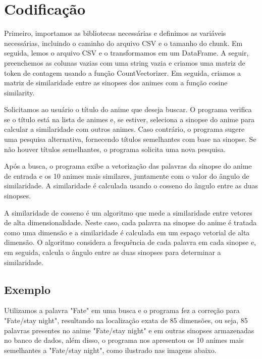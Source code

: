 \documentclass[12pt,a4]{article}
\begin{document}
\section{Codificação}
\begin{flushleft}
Primeiro, importamos as bibliotecas necessárias e definimos as variáveis necessárias, incluindo o caminho do arquivo CSV e o tamanho do chunk. Em seguida, lemos o arquivo CSV e o transformamos em um DataFrame. A seguir, preenchemos as colunas vazias com uma string vazia e criamos uma matriz de token de contagem usando a função CountVectorizer. Em seguida, criamos a matriz de similaridade entre as sinopses dos animes com a função cosine similarity.
\end{flushleft}
\begin{flushleft}
Solicitamos ao usuário o título do anime que deseja buscar. O programa verifica se o título está na lista de animes e, se estiver, seleciona a sinopse do anime para calcular a similaridade com outros animes. Caso contrário, o programa sugere uma pesquisa alternativa, fornecendo títulos semelhantes com base na sinopse. Se não houver títulos semelhantes, o programa solicita uma nova pesquisa.
\end{flushleft}
\begin{flushleft}
Após a busca, o programa exibe a vetorização das palavras da sinopse do anime de entrada e os 10 animes mais similares, juntamente com o valor do ângulo de similaridade. A similaridade é calculada usando o cosseno do ângulo entre as duas sinopses.
\end{flushleft}
\begin{flushleft}
A similaridade de cosseno é um algoritmo que mede a similaridade entre vetores de alta dimensionalidade. Neste caso, cada palavra na sinopse do anime é tratada como uma dimensão e a similaridade é calculada em um espaço vetorial de alta dimensão. O algoritmo considera a frequência de cada palavra em cada sinopse e, em seguida, calcula o ângulo entre as duas sinopses para determinar a similaridade.
\end{flushleft}
\begin{flushleft}
\newpage
\section{Exemplo}
Utilizamos a palavra "Fate" em uma busca e o programa fez a correção para "Fate/stay night", resultando na localização exata de 85 dimensões, ou seja, 85 palavras presentes no anime "Fate/stay night" e em outras sinopses armazenadas no banco de dados, além disso, o programa nos apresentou os 10 animes mais semelhantes a "Fate/stay night", como ilustrado nas imagens abaixo.
\end{flushleft}
\end{document}
